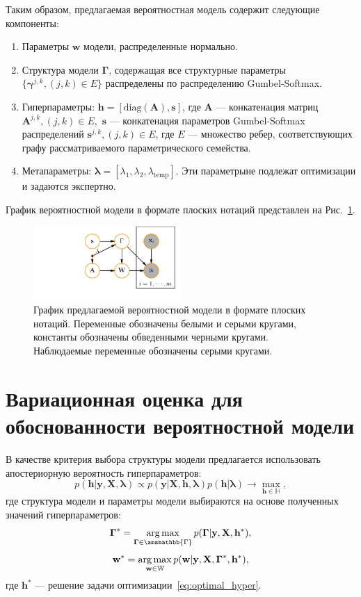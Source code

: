 Таким образом, предлагаемая вероятностная модель содержит следующие компоненты:
\begin{enumerate}
\item Параметры $\mathbf{w}$ модели, распределенные нормально.
\item Структура модели $\boldsymbol{\Gamma}$, содержащая все структурные параметры $\{\boldsymbol{\gamma}^{j,k}, (j,k) \in E\}$ распределены по распределению Gumbel-Softmax.
\item Гиперпараметры: $\mathbf{h} = [\text{diag}(\mathbf{A}), \mathbf{s}]$, где $\mathbf{A}$ --- конкатенация матриц $\mathbf{A}^{j,k}, (j,k) \in E,$ $\mathbf{s}$ --- конкатенация параметров Gumbel-Softmax распределений $\mathbf{s}^{j,k}, (j,k) \in E$, где $E$ --- множество ребер, соответствующих графу рассматриваемого параметрического семейства.
\item Метапараметры: $\boldsymbol{\lambda} = [\lambda_1, \lambda_2, \lambda_\text{temp}].$ Эти параметрыне подлежат оптимизации и задаются экспертно. 
\end{enumerate}

График вероятностной модели в формате плоских нотаций представлен на Рис.~\ref{fig:plate_prob}.
\begin{figure}
\centering
   \includegraphics[width=0.5\textwidth]{plots/notebooks/simple_plate.pdf}
\caption{График предлагаемой вероятностной модели в формате плоских нотаций. Переменные обозначены белыми и серыми кругами, константы обозначены обведенными черными кругами. Наблюдаемые переменные обозначены серыми кругами.}
\label{fig:plate_prob}
\end{figure}

\section{Вариационная оценка для обоснованности вероятностной модели}
В качестве критерия выбора структуры модели предлагается использовать апостериорную вероятность гиперпараметров:
\begin{equation}
\label{eq:optimal_hyper}
    p(\mathbf{h}|\mathbf{y}, \mathbf{X}, \boldsymbol{\lambda}) \propto p(\mathbf{y}|\mathbf{X}, \mathbf{h}, \boldsymbol{\lambda}) p(\mathbf{h}|\boldsymbol{\lambda}) \to \max_{\mathbf{h} \in \mathbb{H}},
\end{equation}
где структура модели и параметры модели выбираются на основе полученных значений гиперпараметров:
\[
    \boldsymbol{\Gamma}^* = \argmax_{\boldsymbol{\Gamma} \in \amsmathbb{\Gamma}} p(\boldsymbol{\Gamma}|\mathbf{y}, \mathbf{X}, \mathbf{h}^*),
\]
\[
    \mathbf{w}^* = \operatorname*{arg\,max}_{\mathbf{w} \in \mathbb{W}} p(\mathbf{w}|\mathbf{y}, \mathbf{X}, \boldsymbol{\Gamma}^*, \mathbf{h}^*),
\]
где $\mathbf{h}^*$ --- решение задачи оптимизации~\eqref{eq:optimal_hyper}.

